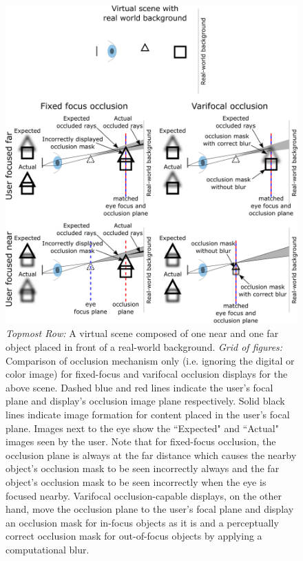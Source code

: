 \begin{figure}[htpb!]
\centering
\includegraphics[width=0.9\columnwidth]{images/varifocal_occlusion/depth-dependent-occlusion}
\caption[Varifocal-Occlusion NED: concept of depth-dependent occlusion]{\emph{Topmost Row:} A virtual scene composed of one near and one far object placed in front of a real-world background. \emph{Grid of figures:} Comparison of occlusion mechanism only (i.e. ignoring the digital or color image) for fixed-focus and varifocal occlusion displays for the above scene. Dashed blue and red lines indicate the user's focal plane and display's occlusion image plane respectively. Solid black lines indicate image formation for content placed in the user's focal plane. Images next to the eye show the ``Expected" and ``Actual" images seen by the user. Note that for fixed-focus occlusion, the occlusion plane is always at the far distance which causes the nearby object's occlusion mask to be seen incorrectly always and the far object's occlusion mask to be seen incorrectly when the eye is focused nearby. Varifocal occlusion-capable displays, on the other hand, move the occlusion plane to the user's focal plane and display an occlusion mask for in-focus objects as it is and a perceptually correct occlusion mask for out-of-focus objects by applying a computational blur.}
\label{fig:varifocal_occlusion:depth-dependent-occlusion}
\end{figure}
